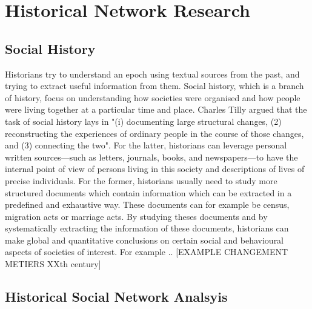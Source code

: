 \section{Historical Network Research}

\subsection{Social History}

Historians try to understand an epoch using textual sources from the past, and trying to extract useful information from them.
Social history, which is a branch of history, focus on understanding how societies were organised and how people were living together at a particular time and place. Charles Tilly argued that the task of social history lays in "(i) documenting large structural changes, (2) reconstructing the experiences of ordinary people in the course of those changes, and (3) connecting the two". For the latter, historians can leverage personal written sources---such as letters, journals, books, and newspapers---to have the internal point of view of persons living in this society and descriptions of lives of precise individuals.
For the former, historians usually need to study more structured documents which contain information which can be extracted in a predefined and exhaustive way.
These documents can for example be census, migration acts or marriage acts. By studying theses documents and by systematically extracting the information of these documents, historians can make global and quantitative conclusions on certain social and behavioural aspects of societies of interest.
For example .. [EXAMPLE CHANGEMENT METIERS XXth century]


\subsection{Historical Social Network Analsyis}

